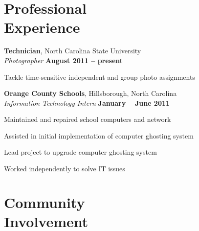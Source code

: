 \documentclass[margin,line,letterpaper]{resume}
\begin{document}
\begin{resume}
    \section{\mysidestyle Professional\\Experience}

    \textbf{Technician}, North Carolina State University \vspace{2mm}\\\vspace{1mm}%
    \textsl{Photographer} \hfill \textbf{August 2011 -- present}\vspace{-3mm}\\\vspace{-1mm}%
    \begin{list2}
    \item Tackle time-sensitive independent and group photo assignments
    \end{list2}\vspace{-1.5mm}

    \textbf{Orange County Schools}, Hillsborough, North Carolina \vspace{2mm}\\\vspace{1mm}%
    \textsl{Information Technology Intern} \hfill \textbf{January -- June 2011}\vspace{-3mm}\\\vspace{-1mm}%
    \begin{list2}
    \item Maintained and repaired school computers and network
    \item Assisted in initial implementation of computer ghosting system 
    \item Lead project to upgrade computer ghosting system
    \item Worked independently to solve IT issues
    \end{list2}\vspace{-1.5mm}


    \section{\mysidestyle Community\\Involvement}


\end{resume}
\end{document}
